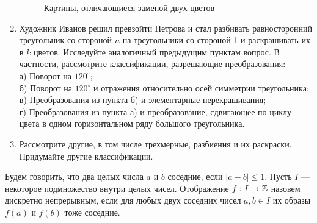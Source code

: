 \begin{enumerate}
\begin{figure}[h]
\begin{center}
\end{center}
\caption{Картины, отличающиеся заменой двух цветов}
\end{figure}
\item Художник Иванов решил превзойти Петрова и стал разбивать равносторонний треугольник со стороной $n$ на треугольники со стороной 1 и раскрашивать их в $k$ цветов. Исследуйте аналогичный предыдущим пунктам вопрос. В частности, рассмотрите классификации, разрешающие преобразования: \\
а) Поворот на $120^{\circ}$; \\
б) Поворот на $120^{\circ}$ и отражения относительно осей симметрии треугольника; \\
в) Преобразования из пункта б) и элементарные перекрашивания; \\
г) Преобразования из пункта а) и преобразование, сдвигающее по циклу цвета в одном горизонтальном ряду большого треугольника.
\item Рассмотрите другие, в том числе трехмерные, разбиения и их раскраски. Придумайте другие классификации.

\end{enumerate}



 Будем говорить, что два целых числа $a$ и $b$ соседние, если $|a-b|\leq 1$. Пусть $I$ --- некоторое подмножество внутри целых чисел. Отображение $f:I\to \mathbb{Z}$ назовем дискретно непрерывным, если для любых двух соседних чисел $a,b\in I$ их образы $f(a)$ и $f(b)$ тоже соседние. 

